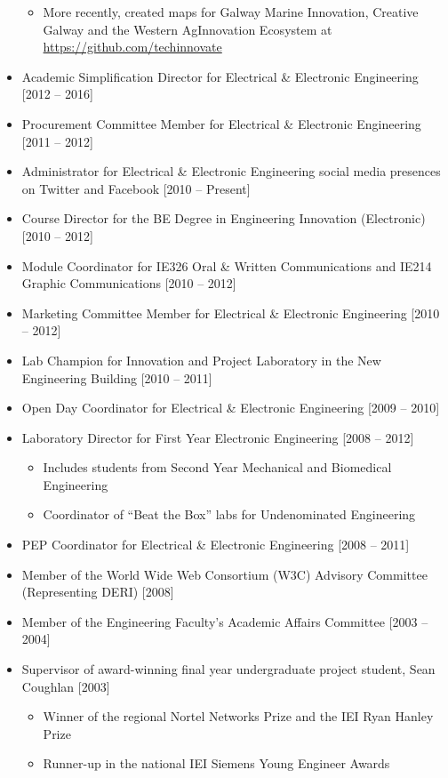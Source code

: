 \documentclass[10pt,a4paper]{res} %
\begin{document}
\begin{resume}
\begin{itemize}
\begin{itemize}
\item More recently, created maps for Galway Marine Innovation, Creative Galway and the Western AgInnovation Ecosystem at \url{https://github.com/techinnovate}
\end{itemize}
\item Academic Simplification Director for Electrical \& Electronic Engineering [2012 -- 2016]
\item Procurement Committee Member for Electrical \& Electronic Engineering [2011 -- 2012]
\item Administrator for Electrical \& Electronic Engineering social media presences on Twitter and Facebook [2010 -- Present]
\item Course Director for the BE Degree in Engineering Innovation (Electronic) [2010 -- 2012]
\item Module Coordinator for IE326 Oral \& Written Communications and IE214 Graphic Communications [2010 -- 2012]
\item Marketing Committee Member for Electrical \& Electronic Engineering [2010 -- 2012]
\item Lab Champion for Innovation and Project Laboratory in the New Engineering Building [2010 -- 2011]
\item Open Day Coordinator for Electrical \& Electronic Engineering [2009 -- 2010]
\item Laboratory Director for First Year Electronic Engineering [2008 -- 2012]
\begin{itemize} \itemsep -2pt
\item Includes students from Second Year Mechanical and Biomedical Engineering
\item Coordinator of ``Beat the Box'' labs for Undenominated Engineering
\end{itemize}
\item PEP Coordinator for Electrical \& Electronic Engineering [2008 -- 2011]
\item Member of the World Wide Web Consortium (W3C) Advisory Committee (Representing DERI) [2008]
\item Member of the Engineering Faculty's Academic Affairs Committee [2003 -- 2004]
\item Supervisor of award-winning final year undergraduate project student, Sean Coughlan [2003]
\begin{itemize} \itemsep -2pt
\item Winner of the regional Nortel Networks Prize and the IEI Ryan Hanley Prize
\item Runner-up in the national IEI Siemens Young Engineer Awards

\end{itemize}
\end{itemize}
\end{resume}
\end{document}
